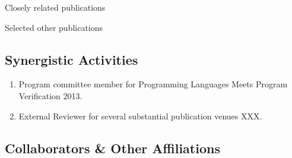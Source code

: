 
\noindent Closely related publications


\noindent
\noindent Selected other publications

\subsection*{Synergistic Activities}


\begin{enumerate}\itemsep 0pt
  \item Program committee member for Programming Languages Meets Program Verification 2013.
  \item External Reviewer for several substantial publication venues XXX.
\end{enumerate}


\subsection*{Collaborators \& Other Affiliations}

\noindent

